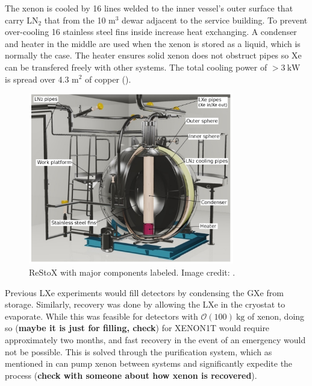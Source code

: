 The xenon is cooled by 16 lines welded to the inner vessel's outer surface that carry LN$_2$ that from the 10 m$^3$ dewar adjacent to the
service building.  To prevent over-cooling 16 stainless steel fins inside increase heat
exchanging.  A condenser and heater in the middle are used when the xenon is stored as a liquid, which is normally the case.  The heater
ensures solid xenon does not obstruct pipes so Xe can be transfered freely with other systems.  The total cooling power of
$> 3\ \mathrm{kW}$ is spread over 4.3 m$^2$ of copper ().

\begin{figure}
\centering
\includegraphics[width=0.8\textwidth]{ReStoX}
\caption{ReStoX with major components labeled.  Image credit: .}
\label{fig:xenon1t_restox_pic}
\end{figure}

Previous LXe experiments would fill detectors by condensing the GXe from storage.  Similarly, recovery was done by allowing the LXe
in the cryostat to evaporate.  While this was feasible for detectors with $\mathcal{O}(100)\ \mathrm{kg}$ of xenon, doing so
(\textbf{maybe it is just for filling, check}) for XENON1T would require approximately two months, and fast recovery in the event of an
emergency would not be possible.  This is solved through the purification system, which as mentioned in  can
pump xenon between systems and significantly expedite the process (\textbf{check with someone about how xenon is recovered}).



